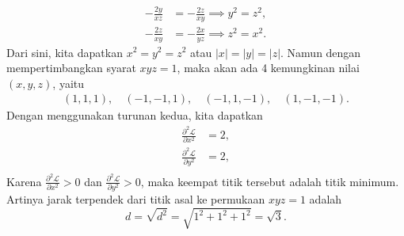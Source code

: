 \documentclass[11pt,a4paper]{article}
\begin{document}
\begin{enumerate}
\begin{align*}
          -\frac{2y}{xz} & = -\frac{2z}{xy} \implies y^2 = z^2, \\
          -\frac{2z}{xy} & = -\frac{2x}{yz} \implies z^2 = x^2.
        \end{align*}
        Dari sini, kita dapatkan $x^2 = y^2 = z^2$ atau $|x| = |y| = |z|$. Namun dengan mempertimbangkan syarat $xyz = 1$, maka akan ada 4 kemungkinan nilai $(x, y, z)$, yaitu
        \begin{align*}
          (1, 1, 1), \quad (-1, -1, 1), \quad (-1, 1, -1), \quad (1, -1, -1).
        \end{align*}
        Dengan menggunakan turunan kedua, kita dapatkan
        \begin{align*}
          \frac{\partial^2 \mathcal{L}}{\partial x^2} & = 2, \\
          \frac{\partial^2 \mathcal{L}}{\partial y^2} & = 2, \\
        \end{align*}
        Karena $\frac{\partial^2 \mathcal{L}}{\partial x^2} > 0$ dan $\frac{\partial^2 \mathcal{L}}{\partial y^2} > 0$, maka keempat titik tersebut adalah titik minimum. Artinya jarak terpendek dari titik asal ke permukaan $xyz = 1$ adalah
        \[
          d = \sqrt{d^2} = \sqrt{1^2 + 1^2 + 1^2} = \sqrt{3}.
        \]

\end{enumerate}
\end{document}

